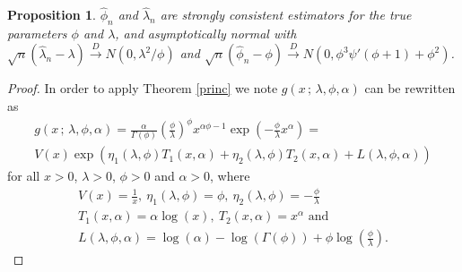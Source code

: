 \documentclass[10pt,a4paper,onecolumn]{article} %
\newtheorem{proposition}[theorem]{Proposition}
\begin{document}
\begin{proposition}\label{proofgamma} $\hat\phi_n$ and $\hat\lambda_n$ are strongly consistent estimators for the true parameters $\phi$ and $\lambda$, and asymptotically normal with $\sqrt{n}\left(\hat{\lambda}_n-\lambda\right)\overset{D}{\to} N\left(0,\lambda^2/\phi\right)$ and $\sqrt{n}\left(\hat{\phi}_n-\phi\right)\overset{D}{\to} N\left(0,\phi^3\psi'(\phi+1)+\phi^2\right)$.
\end{proposition}
\begin{proof}In order to apply Theorem \ref{princ}
 we note $g(x\,;\,\lambda,\phi,\alpha)$ can be rewritten as
 \begin{equation*}
 \begin{aligned}
 g(x\,;\,\lambda,\phi,\alpha)=\frac{\alpha}{\Gamma(\phi)}\left(\frac{\phi}{\lambda} \right)^\phi x^{\alpha\phi-1}\exp\left(-\frac{\phi}{\lambda} x^\alpha \right)=\\
 V(x)\exp\left(\eta_1(\lambda,\phi)T_1(x,\alpha)+\eta_2(\lambda,\phi)T_2(x,\alpha)+L(\lambda,\phi,\alpha)\right)
 \end{aligned}
 \end{equation*}
for all $x>0$, $\lambda>0$, $\phi>0$ and $\alpha>0$, where
\begin{equation*}
\begin{aligned}V(x)=\frac{1}{x},\ \eta_1(\lambda,\phi)=\phi,\ \eta_2(\lambda,\phi)=-\frac{\phi}{\lambda}\\
T_1(x,\alpha)=\alpha\log(x),\ T_2(x,\alpha) = x^{\alpha}\mbox{ and }\\
L(\lambda,\phi,\alpha)=\log\left(\alpha\right)-\log\left(\Gamma(\phi)\right)+\phi\log\left(\frac{\phi}{\lambda}\right).
\end{aligned}
\end{equation*}


\end{proof}
\end{document}
